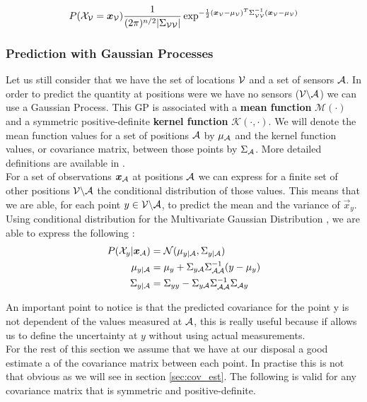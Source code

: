 \documentclass[12pt,twoside]{report}
\begin{document}
\begin{equation}
	P(\mathcal{X}_{\mathcal{V}} = {\boldsymbol{{x}}}_{\mathcal{V}}) \frac{1}{(2\pi)^{n/2} |\Sigma_{\mathcal{V}\mathcal{V}}|} \exp^{-\frac{1}{2}({\boldsymbol{{x}}}_{\mathcal{V}} - \mu_{\mathcal{V}})^T \Sigma_{\mathcal{V}\mathcal{V}}^{-1} ({\boldsymbol{{x}}}_{\mathcal{V}} - \mu_{\mathcal{V}})}
\end{equation}


\subsubsection{Prediction with Gaussian Processes}
Let us still consider that we have the set of locations $\mathcal{V}$ and a set of sensors $\mathcal{A}$. In order to predict the quantity at positions were we have no sensors ($\mathcal{V} \backslash \mathcal{A} $) we can use a Gaussian Process. This GP is associated with a \textbf{mean function} $\mathcal{M}(\cdot)$ and a symmetric positive-definite \textbf{kernel function} $\mathcal{K}(\cdot,\cdot)$. We will denote the mean function values for a set of positions $\mathcal{A}$ by $\mu_{\mathcal{A}}$ and the kernel function values, or covariance matrix, between those points by $\Sigma_{\mathcal{A}}$. More detailed definitions are available in \citet[p.~13-16]{rasmussen_gaussian_2006}. \\

For a set of observations ${\boldsymbol{{x}}}_{\mathcal{A}}$ at positions $\mathcal{A}$ we can express for a finite set of other positions $\mathcal{V} \backslash \mathcal{A} $ the conditional distribution of those values. This means that we are able, for each point $y \in \mathcal{V} \backslash \mathcal{A} $, to predict the mean and the variance of $\vec{x}_y$. Using conditional distribution for the Multivariate Gaussian Distribution \citep[p.~193]{deisenroth_mathematics_2018}, we are able to express the following : 
\begin{align}
	P(\mathcal{X}_y | {\boldsymbol{{x}}}_{\mathcal{A}} ) &= \mathcal{N}(\mu_{y | \mathcal{A}}, \Sigma_{y | \mathcal{A}}) \\
	\mu_{y | \mathcal{A}} &= \mu_y + \Sigma_{y\mathcal{A}} \Sigma_{\mathcal{A}\mathcal{A}}^{-1} (y - \mu_y)\\ 
	\Sigma_{y | \mathcal{A}} &=  \Sigma_{yy} - \Sigma_{y\mathcal{A}} \Sigma_{\mathcal{A}\mathcal{A}}^{-1} \Sigma_{\mathcal{A} y}
\end{align}


An important point to notice is that the predicted covariance for the point y is not dependent of the values measured at $\mathcal{A}$, this is really useful because if allows us to define the uncertainty at $y$ without using actual measurements. \\

For the rest of this section we assume that we have at our disposal a good estimate a of the covariance matrix between each point. In practise this is not that obvious as we will see in section \ref{sec:cov_est}. The following is valid for any covariance matrix that is symmetric and positive-definite. 
 
\end{document}
